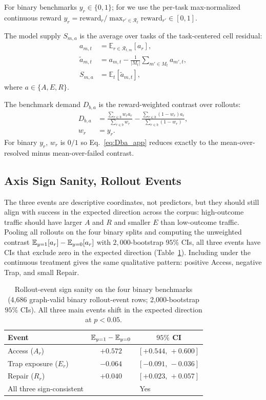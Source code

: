 For binary benchmarks $y_r\in\{0,1\}$; for \mcp{} we use the per-task max-normalized continuous reward $y_r=\text{reward}_r/\max_{r'\in\mathcal{R}_t}\text{reward}_{r'}\in[0,1]$.

The model supply $S_{m,a}$ is the average over tasks of the task-centered cell residual:
\begin{align}
a_{m,t} &= \mathbb{E}_{r\in\mathcal{R}_{t,m}}[a_r], \nonumber\\
\tilde a_{m,t} &= a_{m,t}-\frac{1}{|M_t|}\sum_{m'\in M_t}a_{m',t}, \nonumber\\
S_{m,a} &= \mathbb{E}_t[\tilde a_{m,t}],
\end{align}
where $a\in\{A,E,R\}$.

The benchmark demand $D_{b,a}$ is the reward-weighted contrast over rollouts:
\begin{align}
D_{b,a}
&= \frac{\sum_{r\in b} w_r a_r}{\sum_{r\in b} w_r}
 - \frac{\sum_{r\in b} (1-w_r)a_r}{\sum_{r\in b} (1-w_r)}, \nonumber\\
w_r &= y_r.
\label{eq:Dba_app}
\end{align}
For binary $y_r$, $w_r$ is $0/1$ so Eq.~\ref{eq:Dba_app} reduces exactly to the mean-over-resolved minus mean-over-failed contrast.

\subsection{Axis Sign Sanity, Rollout Events}
\label{app:axis_sign_v2}

The three events are descriptive coordinates, not predictors, but they should still align with success in the expected direction across the corpus: high-outcome traffic should have larger $A$ and $R$ and smaller $E$ than low-outcome traffic.
Pooling all rollouts on the four binary splits and computing the unweighted contrast $\mathbb{E}_{y=1}[a_r] - \mathbb{E}_{y=0}[a_r]$ with $2{,}000$-bootstrap $95\%$ CIs, all three events have CIs that exclude zero in the expected direction (Table~\ref{tab:axis_sign_v2}).
Including \mcp{} under the continuous treatment gives the same qualitative pattern: positive Access, negative Trap, and small Repair.

\begin{table}[h]
\centering
\scriptsize
\setlength{\tabcolsep}{3pt}
\begin{tabular}{lcc}
\toprule
\textbf{Event} & \textbf{$\mathbb{E}_{y=1}-\mathbb{E}_{y=0}$} & \textbf{$95\%$ CI} \\
\midrule
Access ($A_r$)             & $+0.572$ & $[+0.544,\,+0.600]$ \\
Trap exposure ($E_r$)      & $-0.064$ & $[-0.091,\,-0.036]$ \\
Repair ($R_r$)             & $+0.040$ & $[+0.023,\,+0.057]$ \\
\midrule
All three sign-consistent  & \multicolumn{2}{c}{Yes} \\
\bottomrule
\end{tabular}
\caption{Rollout-event sign sanity on the four binary benchmarks (4,686 graph-valid binary rollout-event rows; 2,000-bootstrap $95\%$ CIs). All three main events shift in the expected direction at $p<0.05$.}
\label{tab:axis_sign_v2}
\end{table}

